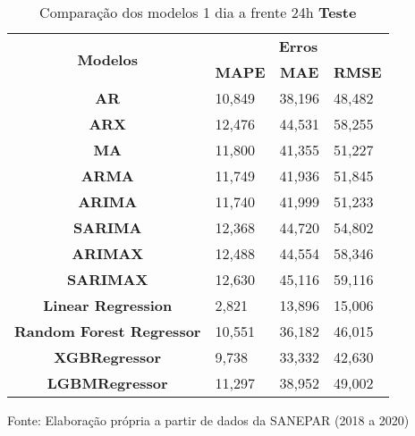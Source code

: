 \begin{table}[H]
	\centering
	\caption{Comparação dos modelos 1 dia a frente 24h \textbf{Teste} }\label{tb:1-24tst}
	\begin{tabular}{@{}clll@{}}
		\toprule
		\multirow{2}{*}{\textbf{Modelos}} & \multicolumn{3}{c}{\textbf{Erros}}                                                                       \\ \cmidrule(l){2-4} 
		& \multicolumn{1}{c}{\textbf{MAPE}} & \multicolumn{1}{c}{\textbf{MAE}} & \multicolumn{1}{c}{\textbf{RMSE}} \\ \hline
\textbf{AR}                       & 10,849                            & 38,196                           & 48,482                            \\
\textbf{ARX}                      & 12,476                            & 44,531                           & 58,255                            \\
\textbf{MA}                       & 11,800                            & 41,355                           & 51,227                            \\
\textbf{ARMA}                     & 11,749                            & 41,936                           & 51,845                            \\
\textbf{ARIMA}                    & 11,740                            & 41,999                           & 51,233                            \\
\textbf{SARIMA}                   & 12,368                            & 44,720                           & 54,802                            \\
\textbf{ARIMAX}                   & 12,488                            & 44,554                           & 58,346                            \\
\textbf{SARIMAX}                  & 12,630                            & 45,116                           & 59,116                            \\
\textbf{Linear Regression}        & 2,821                             & 13,896                           & 15,006                            \\
\textbf{Random Forest Regressor}  & 10,551                            & 36,182                           & 46,015                            \\
\textbf{XGBRegressor}             & 9,738                             & 33,332                           & 42,630                            \\
\textbf{LGBMRegressor}            & 11,297                            & 38,952                           & 49,002                            \\ \bottomrule
	\end{tabular}

Fonte: Elaboração própria a partir de dados da SANEPAR (2018 a 2020)
\end{table}

